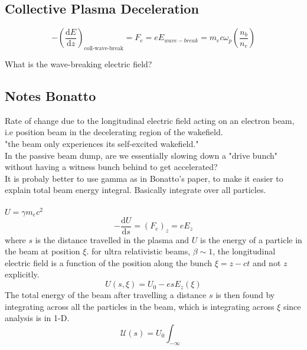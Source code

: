 \subsection{Collective Plasma Deceleration}

\begin{equation}
-\left(\frac{\mathrm{d}E}{\mathrm{d}z}\right)_{\text{coll-wave-break}}=F_e=eE_{wave-break}=m_e c\omega_{p}\left(\frac{n_b}{n_e}\right)
\end{equation}

What is the wave-breaking electric field?

\subsection{Notes Bonatto}
Rate of change due to the longitudinal electric field acting on an electron beam, i.e position beam in the decelerating region of the wakefield.\\
"the beam only experiences its self-excited wakefield."\\
In the passive beam dump, are we essentially slowing down a "drive bunch" without having a witness bunch behind to get accelerated?\\
It is probaly better to use gamma as in Bonatto's paper, to make it easier to explain total beam energy integral. Basically integrate over all particles.\\
\\
$U=\gamma m_ec^2$
\begin{equation}
-\frac{\mathrm{d}U}{\mathrm{d}s}=(F_e)_z=eE_z
\end{equation}
where $s$ is the distance travelled in the plasma and $U$ is the energy of a particle in the beam at position $\xi$. 
for ultra relativistic beams, $\beta\sim 1$, the longitudinal electric field is a function of the position along the bunch $\xi=z-ct$ and not $z$ explicitly. 
\begin{equation}
U(s,\xi)=U_0-esE_z(\xi)
\end{equation}
The total energy of the beam after travelling a distance $s$ is then found by integrating across all the particles in the beam, which is integrating across $\xi$ since analysis is in 1-D.
\begin{equation}
\mathcal{U}(s)=U_0\int_{-\infty}
\end{equation}

